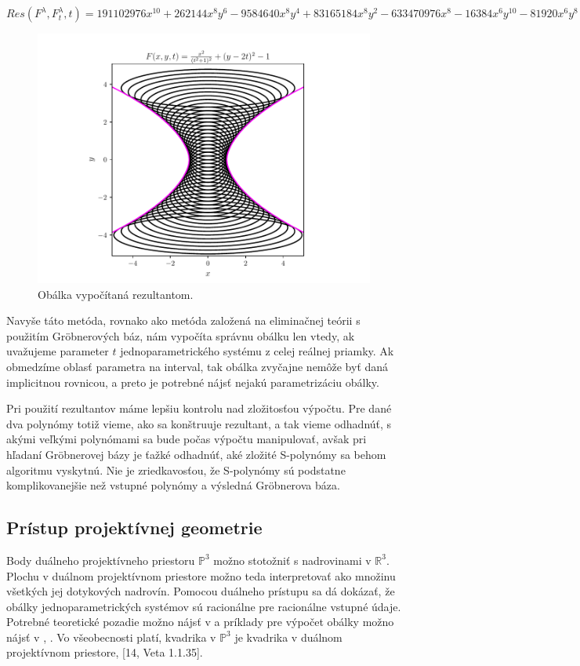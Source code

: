 $ Res(F^\lambda , F_t^\lambda , t) = 191102976x^{10} + 262144x^8y^6 - 9584640x^8y^4 + 83165184x^8y^2 - 633470976x^8 - 16384x^6y^{10} - 81920x^6y^8 - 14483456x^6y^6 - 113311744x^6y^4 + 96419840x^6y^2 + 698368000x^6 - 16384x^4y^{12} - 294912x^4y^{10} - 2998272x^4y^8 - 18284544x^4y^6 - 74956800x^4y^4 - 184320000x^4y^2 - 256000000x^4. $

\begin{figure}[H]
	\centering
	\includegraphics{images/resultant.pdf}
	\caption{Obálka vypočítaná rezultantom.}
	\label{fig:resultant}
\end{figure}

Navyše táto metóda, rovnako ako metóda založená na eliminačnej teórii s použitím Gröbnerových báz, nám vypočíta správnu obálku len vtedy, ak uvažujeme parameter $t$ jednoparametrického systému z celej reálnej priamky. Ak obmedzíme oblasť parametra na interval, tak obálka zvyčajne nemôže byť daná implicitnou rovnicou, a preto je potrebné nájsť nejakú parametrizáciu obálky. 

Pri použití rezultantov máme lepšiu kontrolu nad zložitosťou výpočtu. Pre dané dva polynómy totiž vieme, ako sa konštruuje rezultant, a tak vieme odhadnúť, s akými veľkými polynómami sa bude počas výpočtu manipulovať, avšak pri hľadaní Gröbnerovej bázy je ťažké odhadnúť, aké zložité S-polynómy sa behom algoritmu vyskytnú. Nie je zriedkavosťou, že S-polynómy sú podstatne komplikovanejšie než vstupné polynómy a výsledná Gröbnerova báza.

\subsection{Prístup projektívnej geometrie}
Body duálneho projektívneho priestoru $\mathbb{P}^3 $ možno stotožniť s nadrovinami v $\mathbb{R}^3$. Plochu v duálnom projektívnom priestore možno teda interpretovať ako množinu všetkých jej dotykových nadrovín. Pomocou duálneho prístupu sa dá dokázať, že obálky jednoparametrických systémov sú racionálne pre racionálne vstupné údaje. Potrebné teoretické pozadie možno nájsť v \cite{Pott01} a príklady pre výpočet obálky možno nájsť v \cite{Vra22}, \cite{Pet08}.
Vo všeobecnosti platí, kvadrika v $\mathbb{P}^3$ je kvadrika v duálnom projektívnom priestore, [14, Veta 1.1.35].


